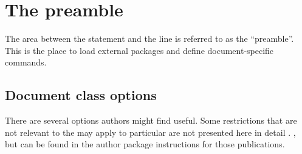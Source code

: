 \section{The preamble}

The area between the  statement and the line
\verb++ is referred to as the ``preamble''.  This is
the place to load external packages and define document-specific
commands.

\subsection{Document class options}

There are several  options authors might find useful.
Some restrictions that
\ifmemoirs
 are not relevant to the \Memos
\else
 may apply to particular 
\fi
are not presented here in detail%
\ifmemoirs .
\else
 , but can be found in the author package instructions for those
 publications.
\fi


